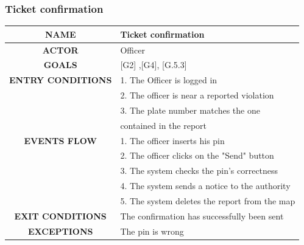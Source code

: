 \documentclass[12pt,a4paper]{article}
\begin{document}
\subsubsection{Ticket confirmation}
		\begin{center}
			\begin{tabular}{| c | l |}
				\hline
				\textbf{NAME} & Ticket confirmation \\
				\hline
				\textbf{ACTOR} & Officer \\
				\hline
				\textbf{GOALS} & [G2] ,[G4], [G.5.3] \\
				\hline
				\textbf{ENTRY CONDITIONS} &1. The Officer is logged in \\
				&2. The officer is near a reported violation \\
				&3. The plate number matches the one \\
				& contained in the report\\ \hline
				\textbf{EVENTS FLOW}  &
				1. The officer inserts his pin \\
				&2. The officer clicks on the "Send" button\\	
				&3. The system checks the pin's correctness \\
				&4. The system sends a notice to the authority \\
				&5. The system deletes the report from the map \\ 
				\hline
				\textbf{EXIT CONDITIONS}  & The confirmation has successfully been sent \\ \hline
				\textbf{EXCEPTIONS} &
			 The pin is wrong \\
				\hline
			\end{tabular}
		\end{center}
\end{document}

